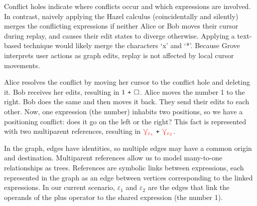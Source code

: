 \documentclass[nonacm, acmsmall, screen, review]{acmart}
\newcommand{\e}{\varepsilon}
\newcommand{\id}[1]{\textcolor{gray}{\ensuremath{#1}}}
\newcommand{\eid}[2]{{#2}^{\id{#1}}}
\newcommand{\eFun}[4]{\eid{#1}{\lambda}#2{:}#3{.}#4}
\newcommand{\ePlus}[3]{#2~\eid{#1}{\texttt{+}}~#3}
\newcommand{\eTimes}[3]{#2~\eid{#1}{\texttt{*}}~#3}
\newcommand{\hole}{\ensuremath{\square}} %
\newcommand{\multiVertex}[1]{\textcolor{red}{\ensuremath{\curlyveedownarrow_{#1}}}}
\begin{document}
Conflict holes indicate where conflicts occur and which expressions are involved.
In contrast, naively applying the Hazel calculus (coincidentally and silently) merges the conflicting expressions if neither Alice or Bob moves their cursor during replay, 
and causes their edit states to diverge otherwise.
Applying a text-based technique would likely merge the characters `x' and `*'.
Because Grove interprets user actions as graph edits, replay is not affected by local cursor movements.


Alice resolves the conflict by moving her cursor to the conflict hole and deleting it.
Bob receives her edits, resulting in $\ePlus{}{1}{\hole}$.
Alice moves the number 1 to the right.
Bob does the same and then moves it back.
They send their edits to each other.
Now, one expression (the number) inhabits two positions, so we have a positioning conflict:
does it go on the left or the right?
This fact is represented with two multiparent references,
resulting in $\ePlus{}{\multiVertex{\e_1}}{\multiVertex{\e_2}}$.

In the graph, edges have identities, so multiple edges may have a common origin and destination.
Multiparent references allow us to model many-to-one relationships as trees.
References are symbolic links between expressions, each represented in the graph as an edge between vertices corresponding to the linked expressions.
In our current scenario, $\e_1$ and $\e_2$ are the edges that link the operands of the plus operator to the shared expression (the number 1).

\end{document}
